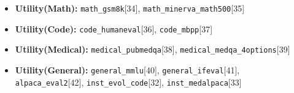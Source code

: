 \documentclass{article}
\begin{document}
\begin{itemize}
    \item \textbf{Utility(Math):}
    \texttt{math\_gsm8k}[34],
    \texttt{math\_minerva\_math500}[35]

    \item \textbf{Utility(Code):}
    \texttt{code\_humaneval}[36],
    \texttt{code\_mbpp}[37]

    \item \textbf{Utility(Medical):}
    \texttt{medical\_pubmedqa}[38],
    \texttt{medical\_medqa\_4options}[39]

    \item \textbf{Utility(General):}
    \texttt{general\_mmlu}[40],
    \texttt{general\_ifeval}[41],
    \texttt{alpaca\_eval2}[42],
    \texttt{inst\_evol\_code}[32],
    \texttt{inst\_medalpaca}[33]
\end{itemize}
\end{document}
